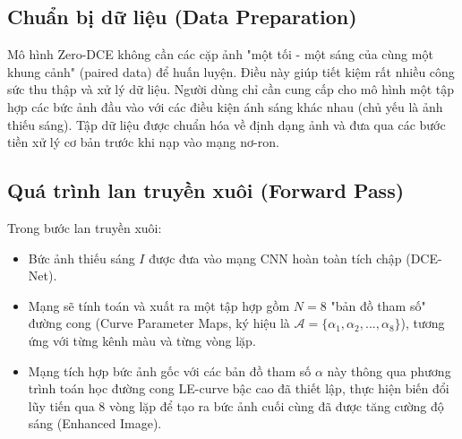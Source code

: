 \documentclass[a4paper]{article}
\begin{document}
\subsection{Chuẩn bị dữ liệu (Data Preparation)}
Mô hình Zero-DCE không cần các cặp ảnh "một tối - một sáng của cùng một khung cảnh" (paired data) để huấn luyện. Điều này giúp tiết kiệm rất nhiều công sức thu thập và xử lý dữ liệu. Người dùng chỉ cần cung cấp cho mô hình một tập hợp các bức ảnh đầu vào với các điều kiện ánh sáng khác nhau (chủ yếu là ảnh thiếu sáng). Tập dữ liệu được chuẩn hóa về định dạng ảnh và đưa qua các bước tiền xử lý cơ bản trước khi nạp vào mạng nơ-ron.

\subsection{Quá trình lan truyền xuôi (Forward Pass)}
Trong bước lan truyền xuôi:
\begin{itemize}
    \item Bức ảnh thiếu sáng $I$ được đưa vào mạng CNN hoàn toàn tích chập (DCE-Net).
    \item Mạng sẽ tính toán và xuất ra một tập hợp gồm $N=8$ "bản đồ tham số" đường cong (Curve Parameter Maps, ký hiệu là $\mathcal{A} = \{\alpha_1, \alpha_2, ..., \alpha_8\}$), tương ứng với từng kênh màu và từng vòng lặp.
    \item Mạng tích hợp bức ảnh gốc với các bản đồ tham số $\alpha$ này thông qua phương trình toán học đường cong LE-curve bậc cao đã thiết lập, thực hiện biến đổi lũy tiến qua 8 vòng lặp để tạo ra bức ảnh cuối cùng đã được tăng cường độ sáng (Enhanced Image).
\end{itemize}
\end{document}
